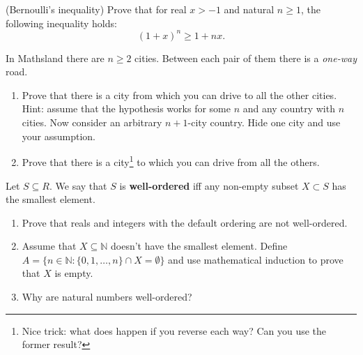 \begin{exercise}
	(Bernoulli's inequality) Prove that for real $x > -1$ and natural $n\ge 1$, the following inequality holds:
	$$(1+x)^n\ge 1+nx.$$
\end{exercise}

\begin{exercise}
	In Mathsland there are $n\ge 2$ cities. Between each pair of them there is a \textit{one-way} road.
	\begin{enumerate}
		\item Prove that there is a city from which you can drive to all the other cities. Hint: assume that the hypothesis works for some $n$ and any
			country with $n$ cities. Now consider an arbitrary $n+1$-city country. Hide one city and use your assumption.
		\item Prove that there is a city\footnote{Nice trick: what does happen if you reverse each way? Can you use the former result?}
			to which you can drive from all the others.
	\end{enumerate}
\end{exercise}

\begin{exercise}
	Let $S\subseteq R$. We say that $S$ is \textbf{well-ordered} iff any non-empty subset $X\subset S$ has the smallest element.
	\begin{enumerate}
		\item Prove that reals and integers with the default ordering are not well-ordered.
		\item Assume that $X\subseteq \mathbb N$ doesn't have the smallest element. Define $A=\{n\in \mathbb N : \{0,1,\dots,n\}\cap X=\emptyset\}$
			and use mathematical induction to prove that $X$ is empty.
		\item Why are natural numbers well-ordered?
	\end{enumerate}
\end{exercise}

